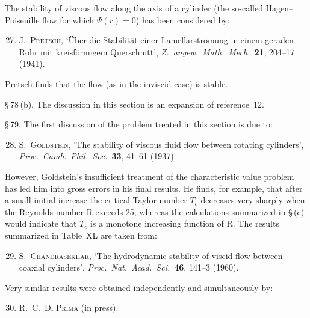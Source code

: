 \noindent The stability of viscous flow along the axis of a cylinder (the so-called Hagen--Poiseuille flow for which $\Psi(r) = 0$) has been considered by:

\begin{enumerate}\setcounter{enumi}{26}
\item J.~\textsc{Pretsch}, `\"Uber die Stabilit\"at einer Lamellarstr\"omung in einem geraden Rohr mit kreisf\"ormigem Querschnitt', \emph{Z.\ angew.\ Math.\ Mech.}\ \textbf{21}, 204--17 (1941).
\end{enumerate}

\noindent Pretsch finds that the flow (as in the inviscid case) is stable.

\noindent \S\,78\,(b). The discussion in this section is an expansion of reference~12.

\medskip
\noindent\S\,79. The first discussion of the problem treated in this section is due to:

\begin{enumerate}\setcounter{enumi}{27}
\item S.~\textsc{Goldstein}, `The stability of viscous fluid flow between rotating cylinders', \emph{Proc.\ Camb.\ Phil.\ Soc.}\ \textbf{33}, 41--61 (1937).
\end{enumerate}

\noindent However, Goldstein's insufficient treatment of the characteristic value problem has led him into gross errors in his final results. He finds, for example, that after a small initial increase the critical Taylor number $T_c$ decreases very sharply when the Reynolds number R exceeds 25; whereas the calculations summarized in \S\,(c) would indicate that $T_c$ is a monotone increasing function of R. The results summarized in Table~XL are taken from:

\begin{enumerate}\setcounter{enumi}{28}
\item S.~\textsc{Chandrasekhar}, `The hydrodynamic stability of viscid flow between coaxial cylinders', \emph{Proc.\ Nat.\ Acad.\ Sci.}\ \textbf{46}, 141--3 (1960).
\end{enumerate}

\noindent Very similar results were obtained independently and simultaneously by:

\begin{enumerate}\setcounter{enumi}{29}
\item R.~C.~\textsc{Di Prima} (in press).
\end{enumerate}


